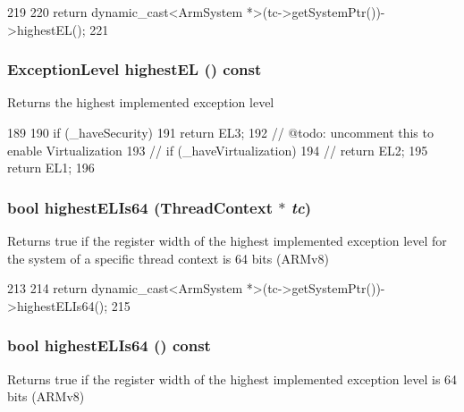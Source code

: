 \begin{DoxyCode}
219 {
220     return dynamic_cast<ArmSystem *>(tc->getSystemPtr())->highestEL();
221 }
\end{DoxyCode}
\hypertarget{classArmSystem_ac97823fdad4c16dec297e6e92887ba5f}{
\subsubsection[{highestEL}]{\setlength{\rightskip}{0pt plus 5cm}ExceptionLevel highestEL () const}}
\label{classArmSystem_ac97823fdad4c16dec297e6e92887ba5f}
Returns the highest implemented exception level 


\begin{DoxyCode}
189     {
190         if (_haveSecurity)
191             return EL3;
192         // @todo: uncomment this to enable Virtualization
193         // if (_haveVirtualization)
194         //     return EL2;
195         return EL1;
196     }
\end{DoxyCode}
\hypertarget{classArmSystem_a94d9b71637c8e790ebb6124498fd1252}{
\subsubsection[{highestELIs64}]{\setlength{\rightskip}{0pt plus 5cm}bool highestELIs64 ({\bf ThreadContext} $\ast$ {\em tc})}}
\label{classArmSystem_a94d9b71637c8e790ebb6124498fd1252}
Returns true if the register width of the highest implemented exception level for the system of a specific thread context is 64 bits (ARMv8) 


\begin{DoxyCode}
213 {
214     return dynamic_cast<ArmSystem *>(tc->getSystemPtr())->highestELIs64();
215 }
\end{DoxyCode}
\hypertarget{classArmSystem_a87a962080af194d9996167c494c30ff1}{
\subsubsection[{highestELIs64}]{\setlength{\rightskip}{0pt plus 5cm}bool highestELIs64 () const}}
\label{classArmSystem_a87a962080af194d9996167c494c30ff1}
Returns true if the register width of the highest implemented exception level is 64 bits (ARMv8) 


